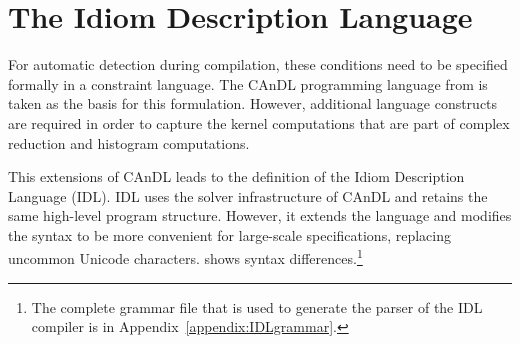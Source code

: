 \section{The Idiom Description Language}

    For automatic detection during compilation, these conditions need to be
    specified formally in a constraint language.
    The CAnDL programming language from  is taken as the
    basis for this formulation.
    However, additional language constructs are required in order to capture
    the kernel computations that are part of complex reduction and histogram
    computations.

    This extensions of CAnDL leads to the definition of the
    Idiom Description Language (IDL).
    IDL uses the solver infrastructure of CAnDL and retains the same high-level
    program structure.
    However, it extends the language and modifies the syntax to be more
    convenient for large-scale specifications, replacing uncommon Unicode
    characters.
     shows syntax differences.\footnote{The complete grammar
    file that is used to generate the parser of the IDL compiler is in
    Appendix~\ref{appendix:IDLgrammar}.}

